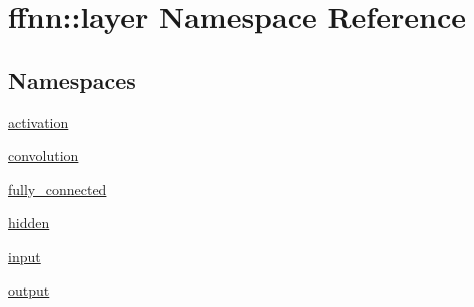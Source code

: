\hypertarget{namespaceffnn_1_1layer}{\section{ffnn\-:\-:layer Namespace Reference}
\label{namespaceffnn_1_1layer}
}
\subsection*{Namespaces}
\begin{DoxyCompactItemize}
\item 
\hyperlink{namespaceffnn_1_1layer_1_1activation}{activation}
\item 
\hyperlink{namespaceffnn_1_1layer_1_1convolution}{convolution}
\item 
\hyperlink{namespaceffnn_1_1layer_1_1fully__connected}{fully\-\_\-connected}
\item 
\hyperlink{namespaceffnn_1_1layer_1_1hidden}{hidden}
\item 
\hyperlink{namespaceffnn_1_1layer_1_1input}{input}
\item 
\hyperlink{namespaceffnn_1_1layer_1_1output}{output}
\end{DoxyCompactItemize}

